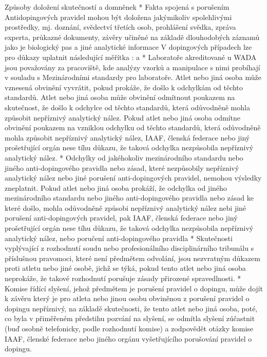 Způsoby doložení skutečností a domněnek
* Fakta spojená s porušením Antidopingových pravidel mohou být doložena jakýmikoliv spolehlivými prostředky, mj. doznání, svědectví třetích osob, prohlášení svědka, zpráva experta, průkazné dokumenty, závěry učiněné na základě dlouhodobých záznamů jako je biologický pas a jiné analytické informace
V dopingových případech lze pro důkazy uplatnit následující měřítka :
  \begitems \style a
  * Laboratoře akreditované u WADA jsou považovány za pracoviště, kde analýzy vzorků a manipulace s nimi probíhají v souladu s Mezinárodními standardy pro laboratoře. Atlet nebo jiná osoba může vznesená obvinění vyvrátit, pokud prokáže, že došlo k odchylkám od těchto standardů. Atlet nebo jiná osoba může obvinění odmítnout poukazem na skutečnost, že došlo k odchylce od těchto standardů, která odůvodněně mohla způsobit nepříznivý analytický nález.
    Pokud atlet nebo jiná osoba odmítne obvinění poukazem na vzniklou odchylku od těchto standardů, která odůvodněně mohla způsobit nepříznivý analytický nález, IAAF, členská federace nebo jiný prošetřující orgán nese tíhu důkazu, že taková odchylka nezpůsobila nepříznivý analytický nález.
  * Odchylky od jakéhokoliv mezinárodního standardu nebo jiného anti-dopingového pravidla nebo zásad, které nezpůsobily nepříznivý analytický nález nebo jiné porušení anti-dopingových pravidel, nemohou výsledky zneplatnit. Pokud atlet nebo jiná osoba prokáží, že odchylka od jiného mezinárodního standardu nebo jiného anti-dopingového pravidla nebo zásad ke které došlo, mohla odůvodněně způsobi nepříznivý analytický nález nebi jiné porušení anti-dopingových pravidel, pak IAAF, členská federace nebo jiný prošetřující orgán nese tíhu důkazu, že taková odchylka nezpůsobila nepříznivý analytický nález, nebo poručení anti-dopingového pravidla
  * Skutečnosti vyplývající z rozhodnutí soudu nebo profesionálního disciplinárního tribunálu s příslušnou pravomoci, které není předmětem odvolání, jsou nezvratným důkazem proti atletu nebo jiné osobě, jichž se týká, pokud tento atlet nebo jiná osoba neprokáže, že takové rozhodnutí porušuje zásady přirozené spravedlnosti.
  * Komise řídící slyšení, jehož předmětem je porušení pravidel o dopingu, může dojít k závěru který je pro atleta nebo jinou osobu obviněnou z porušení pravidel o dopingu nepříznivý, na základě skutečnosti, že tento atlet nebo jiná osoba, poté, co byla v přiměřeném předstihu pozvání na slyšení, se odmítla slyšení zúčastnit (buď osobně telefonicky, podle rozhodnutí komise) a zodpovědět otázky komise IAAF, členské federace nebo jiného orgánu vyšetřujícího porušování pravidel o dopingu.
  \enditems
\enditems

